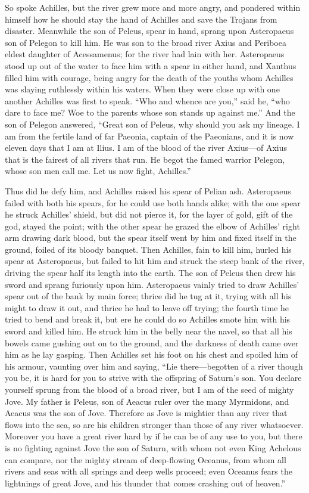 So spoke Achilles, but the river grew more and more angry, and pondered
within himself how he should stay the hand of Achilles and save the
Trojans from disaster. Meanwhile the son of Peleus, spear in hand, sprang
upon Asteropaeus son of Pelegon to kill him. He was son to the broad river
Axius and Periboea eldest daughter of Acessamenus; for the river had lain
with her. Asteropaeus stood up out of the water to face him with a spear
in either hand, and Xanthus filled him with courage, being angry for the
death of the youths whom Achilles was slaying ruthlessly within his
waters. When they were close up with one another Achilles was first to
speak. “Who and whence are you,” said he, “who dare to face me? Woe to the
parents whose son stands up against me.” And the son of Pelegon answered,
“Great son of Peleus, why should you ask my lineage. I am from the fertile
land of far Paeonia, captain of the Paeonians, and it is now eleven days
that I am at Ilius. I am of the blood of the river Axius—of Axius
that is the fairest of all rivers that run. He begot the famed warrior
Pelegon, whose son men call me. Let us now fight, Achilles.”

Thus did he defy him, and Achilles raised his spear of Pelian ash.
Asteropaeus failed with both his spears, for he could use both hands
alike; with the one spear he struck Achilles’ shield, but did not pierce
it, for the layer of gold, gift of the god, stayed the point; with the
other spear he grazed the elbow of Achilles’ right arm drawing dark blood,
but the spear itself went by him and fixed itself in the ground, foiled of
its bloody banquet. Then Achilles, fain to kill him, hurled his spear at
Asteropaeus, but failed to hit him and struck the steep bank of the river,
driving the spear half its length into the earth. The son of Peleus then
drew his sword and sprang furiously upon him. Asteropaeus vainly tried to
draw Achilles’ spear out of the bank by main force; thrice did he tug at
it, trying with all his might to draw it out, and thrice he had to leave
off trying; the fourth time he tried to bend and break it, but ere he
could do so Achilles smote him with his sword and killed him. He struck
him in the belly near the navel, so that all his bowels came gushing out
on to the ground, and the darkness of death came over him as he lay
gasping. Then Achilles set his foot on his chest and spoiled him of his
armour, vaunting over him and saying, “Lie there—begotten of a river
though you be, it is hard for you to strive with the offspring of Saturn’s
son. You declare yourself sprung from the blood of a broad river, but I am
of the seed of mighty Jove. My father is Peleus, son of Aeacus ruler over
the many Myrmidons, and Aeacus was the son of Jove. Therefore as Jove is
mightier than any river that flows into the sea, so are his children
stronger than those of any river whatsoever. Moreover you have a great
river hard by if he can be of any use to you, but there is no fighting
against Jove the son of Saturn, with whom not even King Achelous can
compare, nor the mighty stream of deep-flowing Oceanus, from whom all
rivers and seas with all springs and deep wells proceed; even Oceanus
fears the lightnings of great Jove, and his thunder that comes crashing
out of heaven.”

